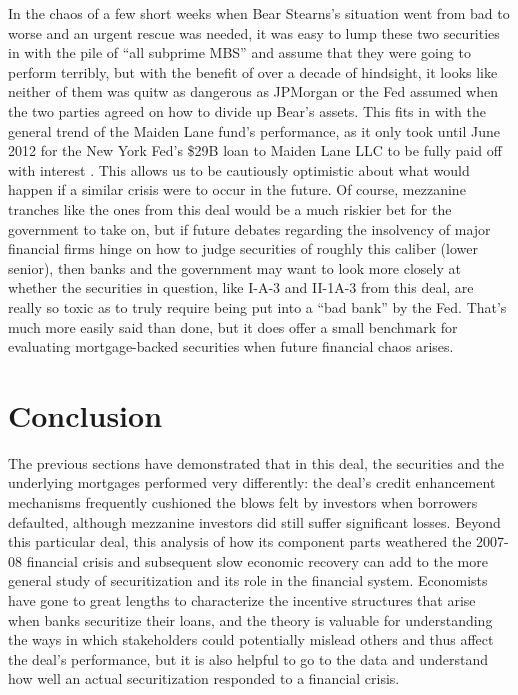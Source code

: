 \documentclass[12pt]{article}
\begin{document}
In the chaos of a few short weeks when Bear Stearns’s situation went from bad to worse and an urgent rescue was needed, it was easy to lump these two securities in with the pile of “all subprime MBS” and assume that they were going to perform terribly, but with the benefit of over a decade of hindsight, it looks like neither of them was quitw as dangerous as JPMorgan or the Fed assumed when the two parties agreed on how to divide up Bear’s assets. This fits in with the general trend of the Maiden Lane fund’s performance, as it only took until June 2012 for the New York Fed’s \$29B loan to Maiden Lane LLC to be fully paid off with interest \parencite{schaefer12}. This allows us to be cautiously optimistic about what would happen if a similar crisis were to occur in the future. Of course, mezzanine tranches like the ones from this deal would be a much riskier bet for the government to take on, but if future debates regarding the insolvency of major financial firms hinge on how to judge securities of roughly this caliber (lower senior), then banks and the government may want to look more closely at whether the securities in question, like I-A-3 and II-1A-3 from this deal, are really so toxic as to truly require being put into a “bad bank” by the Fed. That’s much more easily said than done, but it does offer a small benchmark for evaluating mortgage-backed securities when future financial chaos arises.


\section*{Conclusion}
The previous sections have demonstrated that in this deal, the securities and the underlying mortgages performed very differently: the deal's credit enhancement mechanisms frequently cushioned the blows felt by investors when borrowers defaulted, although mezzanine investors did still suffer significant losses. Beyond this particular deal, this analysis of how its component parts weathered the 2007-08 financial crisis and subsequent slow economic recovery can add to the more general study of securitization and its role in the financial system. Economists have gone to great lengths to characterize the incentive structures that arise when banks securitize their loans, and the theory is valuable for understanding the ways in which stakeholders could potentially mislead others and thus affect the deal’s performance, but it is also helpful to go to the data and understand how well an actual securitization responded to a financial crisis.
\end{document}
